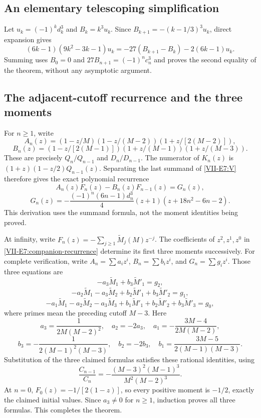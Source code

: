 \documentclass[11pt,letterpaper]{article}
\numberwithin{equation}{section}
\begin{document}
\subsection{An elementary telescoping simplification}
Let $u_k=(-1)^kd_k^3$ and $B_k=k^3u_k$. Since
$B_{k+1}=-(k-1/3)^3u_k$, direct expansion gives
\[
 (6k-1)(9k^2-3k-1)u_k
 =-27(B_{k+1}-B_k)-2(6k-1)u_k.
\]
Summing uses $B_0=0$ and $27B_{n+1}=(-1)^nc_n^3$ and proves the
second equality of the theorem, without any asymptotic argument.

\subsection{The adjacent-cutoff recurrence and the three moments}
For $n\ge1$, write
\[
 A_n(z)=(1-z/M)(1-z/(M-2))(1+z/[2(M-2)]),
\]
\[
 B_n(z)=(1-z/[2(M-1)])(1+z/(M-1))(1+z/(M-3)).
\]
These are precisely $Q_n/Q_{n-1}$ and $D_n/D_{n-1}$.
The numerator of $K_n(z)$ is
$(1+z)(1-z/2)Q_{n-1}(z)$. Separating the last summand of
\eqref{VII-E7:V} therefore gives the exact polynomial recurrence
\begin{equation}\label{VII-E7:companion-recurrence}
 A_n(z)F_n(z)-B_n(z)F_{n-1}(z)=G_n(z),
\end{equation}
\[
 G_n(z)=-\frac{(-1)^n(6n-1)d_n^3}{4}
 (z+1)(z+18n^2-6n-2).
\]
This derivation uses the summand formula, not the moment identities
being proved.

At infinity, write
$F_n(z)=-\sum_{j\ge1}\widetilde M_j(M)z^{-j}$.
The coefficients of $z^2,z^1,z^0$ in
\eqref{VII-E7:companion-recurrence} determine its first three moments
successively. For complete verification, write $A_n=\sum a_i z^i$,
$B_n=\sum b_i z^i$, and $G_n=\sum g_i z^i$. Those three equations are
\[
 -a_3\widetilde M_1+b_3\widetilde M'_1=g_2,
\]
\[
 -a_2\widetilde M_1-a_3\widetilde M_2
 +b_2\widetilde M'_1+b_3\widetilde M'_2=g_1,
\]
\[
 -a_1\widetilde M_1-a_2\widetilde M_2-a_3\widetilde M_3
 +b_1\widetilde M'_1+b_2\widetilde M'_2+b_3\widetilde M'_3=g_0,
\]
where primes mean the preceding cutoff $M-3$. Here
\[
 a_3=\frac1{2M(M-2)^2},\quad a_2=-2a_3,\quad
 a_1=-\frac{3M-4}{2M(M-2)},
\]
\[
 b_3=-\frac1{2(M-1)^2(M-3)},\quad b_2=-2b_3,\quad
 b_1=\frac{3M-5}{2(M-1)(M-3)}.
\]
Substitution of the three claimed formulas satisfies these rational
identities, using
\[
 \frac{C_{n-1}}{C_n}
 =-\frac{(M-3)^2(M-1)^3}{M^2(M-2)^3}.
\]
At $n=0$, $F_0(z)=-1/[2(1-z)]$, so every positive moment is $-1/2$,
exactly the claimed initial values. Since $a_3\ne0$ for $n\ge1$,
induction proves all three formulas. This completes the theorem.
\end{document}
